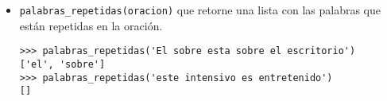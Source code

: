 \begin{itemize}
    \item \texttt{palabras\_repetidas(oracion)} que retorne una lista con las palabras que están repetidas en la oración.
    
    \begin{lstlisting}[style=consola]
>>> palabras_repetidas('El sobre esta sobre el escritorio')
['el', 'sobre']
>>> palabras_repetidas('este intensivo es entretenido')
[]
    \end{lstlisting}
\end{itemize}
